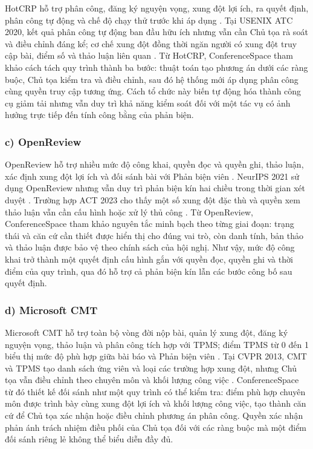 HotCRP hỗ trợ phân công, đăng ký nguyện vọng, xung đột lợi ích, ra quyết định, phân công tự động và chế độ chạy thử trước khi áp dụng \cite{ch2ref3,ch2ref4}. Tại USENIX ATC 2020, kết quả phân công tự động ban đầu hữu ích nhưng vẫn cần Chủ tọa rà soát và điều chỉnh đáng kể; cơ chế xung đột đồng thời ngăn người có xung đột truy cập bài, điểm số và thảo luận liên quan \cite{ch2ref58}. Từ HotCRP, ConferenceSpace tham khảo cách tách quy trình thành ba bước: thuật toán tạo phương án dưới các ràng buộc, Chủ tọa kiểm tra và điều chỉnh, sau đó hệ thống mới áp dụng phân công cùng quyền truy cập tương ứng. Cách tổ chức này biến tự động hóa thành công cụ giảm tải nhưng vẫn duy trì khả năng kiểm soát đối với một tác vụ có ảnh hưởng trực tiếp đến tính công bằng của phản biện.

\subsubsection{c) OpenReview}

OpenReview hỗ trợ nhiều mức độ công khai, quyền đọc và quyền ghi, thảo luận, xác định xung đột lợi ích và đối sánh bài với Phản biện viên \cite{ch2ref5}. NeurIPS 2021 sử dụng OpenReview nhưng vẫn duy trì phản biện kín hai chiều trong thời gian xét duyệt \cite{ch2ref59}. Trường hợp ACT 2023 cho thấy một số xung đột đặc thù và quyền xem thảo luận vẫn cần cấu hình hoặc xử lý thủ công \cite{ch2ref60}. Từ OpenReview, ConferenceSpace tham khảo nguyên tắc minh bạch theo từng giai đoạn: trạng thái và căn cứ cần thiết được hiển thị cho đúng vai trò, còn danh tính, bản thảo và thảo luận được bảo vệ theo chính sách của hội nghị. Như vậy, mức độ công khai trở thành một quyết định cấu hình gắn với quyền đọc, quyền ghi và thời điểm của quy trình, qua đó hỗ trợ cả phản biện kín lẫn các bước công bố sau quyết định.

\subsubsection{d) Microsoft CMT}

Microsoft CMT hỗ trợ toàn bộ vòng đời nộp bài, quản lý xung đột, đăng ký nguyện vọng, thảo luận và phân công tích hợp với TPMS; điểm TPMS từ 0 đến 1 biểu thị mức độ phù hợp giữa bài báo và Phản biện viên \cite{ch2ref6,ch2ref7,ch2ref8}. Tại CVPR 2013, CMT và TPMS tạo danh sách ứng viên và loại các trường hợp xung đột, nhưng Chủ tọa vẫn điều chỉnh theo chuyên môn và khối lượng công việc \cite{ch2ref61}. ConferenceSpace từ đó thiết kế đối sánh như một quy trình có thể kiểm tra: điểm phù hợp chuyên môn được trình bày cùng xung đột lợi ích và khối lượng công việc, tạo thành căn cứ để Chủ tọa xác nhận hoặc điều chỉnh phương án phân công. Quyền xác nhận phản ánh trách nhiệm điều phối của Chủ tọa đối với các ràng buộc mà một điểm đối sánh riêng lẻ không thể biểu diễn đầy đủ.

